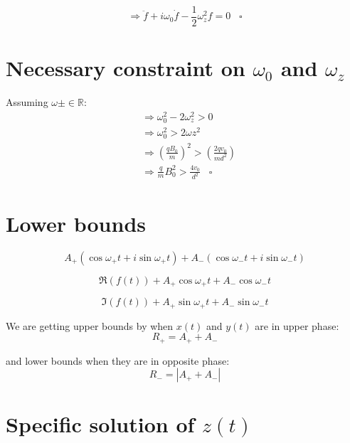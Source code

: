 \documentclass[english,notitlepage,reprint,nofootinbib]{revtex4-1}  %
\begin{document}
\begin{equation*}
    \Rightarrow \ddot{f} + i \omega_0 \dot{f} - \frac{1}{2} \omega_z^2 f = 0 \;\;\; \square
\end{equation*}


\section{Necessary constraint on $\omega_0$ and $\omega_z$}

Assuming $\omega \pm \in \mathbb{R}$:
\begin{align*}
    &\Rightarrow \omega_0^2 - 2 \omega_z^2 > 0\\
    &\Rightarrow \omega_0^2 > 2 \omega z^2\\
    &\Rightarrow \left( \frac{q B_0}{m} \right) ^2 > \left( \frac{2 q v_0}{m d^2} \right)\\
    &\Rightarrow \frac{q}{m} B_0^2 > \frac{4 v_0}{d^2} \;\;\; \square
\end{align*}



\section{Lower bounds}

\begin{equation*}
    A_+ (\cos \omega_+ t + i \sin \omega_+ t) + A_- (\cos \omega_- t + i \sin \omega_- t)
\end{equation*}

\begin{equation*} 
    \Re \left( f(t) \right) + A_+ \cos \omega_+ t + A_- \cos \omega_- t
\end{equation*}

\begin{equation*}
    \Im \left( f(t) \right) + A_+ \sin \omega_+ t + A_- \sin \omega_- t
\end{equation*}

We are getting upper bounds by when $x(t)$ and $y(t)$ are in upper phase:
\begin{equation*}
    R_+ = A_+ + A_-
\end{equation*}

and lower bounds when they are in opposite phase:
\begin{equation*}
    R_- = | A_+ + A_- |
\end{equation*}


\section{Specific solution of $z(t)$}
\end{document}
